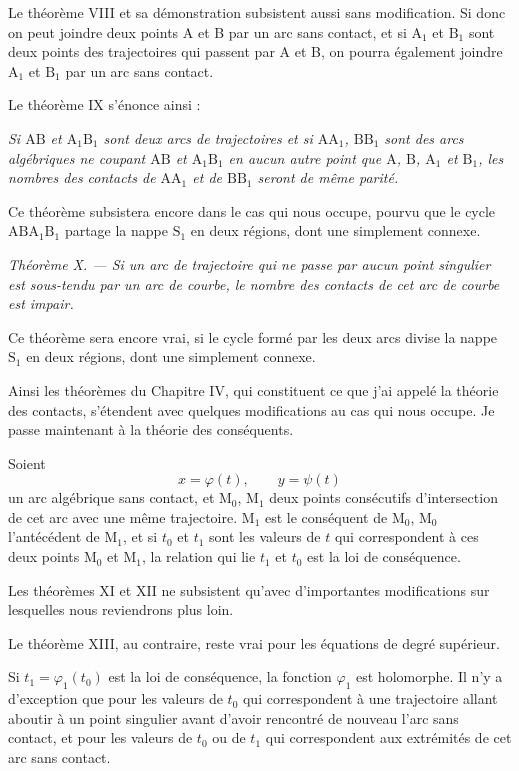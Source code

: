 \documentclass[11pt]{article}
\begin{document}
Le théorème VIII et sa démonstration subsistent aussi sans modification. Si donc on peut joindre deux points A et B par un arc sans contact, et si $\mathrm{A}_1$ et $\mathrm{B}_1$ sont deux points des trajectoires qui passent par A et B, on pourra également joindre $\mathrm{A}_1$ et $\mathrm{B}_1$ par un arc sans contact.

Le théorème IX s’énonce ainsi :

\emph{Si $\mathrm{AB}$ et $\mathrm{A}_1\mathrm{B}_1$ sont deux arcs de trajectoires et si $\mathrm{AA}_1$, $\mathrm{BB}_1$ sont des arcs algébriques ne coupant $\mathrm{AB}$ et $\mathrm{A}_1\mathrm{B}_1$ en aucun autre point que $\mathrm{A}$, $\mathrm{B}$, $\mathrm{A}_1$ et $\mathrm{B}_1$, les nombres des contacts de $\mathrm{AA}_1$ et de $\mathrm{BB}_1$ seront de même parité.}

Ce théorème subsistera encore dans le cas qui nous occupe, pourvu que le cycle $\mathrm{ABA}_1\mathrm{B}_1$ partage la nappe $\mathrm{S}_1$ en deux régions, dont une simplement connexe.

\emph{Théorème X. — Si un arc de trajectoire qui ne passe par aucun point singulier est sous-tendu par un arc de courbe, le nombre des contacts de cet arc de courbe est impair.}

Ce théorème sera encore vrai, si le cycle formé par les deux arcs divise la nappe $\mathrm{S}_1$ en deux régions, dont une simplement connexe.

Ainsi les théorèmes du Chapitre IV, qui constituent ce que j’ai appelé la théorie des contacts, s’étendent avec quelques modifications au cas qui nous occupe. Je passe maintenant à la théorie des conséquents.

Soient
\[
x=\varphi(t),\qquad y=\psi(t)
\]
un arc algébrique sans contact, et $\mathrm{M}_0$, $\mathrm{M}_1$ deux points consécutifs d’intersection de cet arc avec une même trajectoire. $\mathrm{M}_1$ est le conséquent de $\mathrm{M}_0$, $\mathrm{M}_0$ l’antécédent de $\mathrm{M}_1$, et si $t_0$ et $t_1$ sont les valeurs de $t$ qui correspondent à ces deux points $\mathrm{M}_0$ et $\mathrm{M}_1$, la relation qui lie $t_1$ et $t_0$ est la loi de conséquence.

Les théorèmes XI et XII ne subsistent qu’avec d’importantes modifications sur lesquelles nous reviendrons plus loin.

Le théorème XIII, au contraire, reste vrai pour les équations de degré supérieur.

Si $t_1=\varphi_1(t_0)$ est la loi de conséquence, la fonction $\varphi_1$ est holomorphe. Il n’y a d’exception que pour les valeurs de $t_0$ qui correspondent à une trajectoire allant aboutir à un point singulier avant d’avoir rencontré de nouveau l’arc sans contact, et pour les valeurs de $t_0$ ou de $t_1$ qui correspondent aux extrémités de cet arc sans contact.
\end{document}
